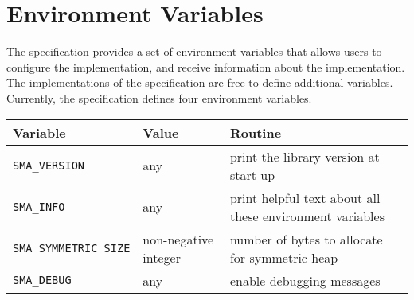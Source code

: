 
\section{Environment Variables }

The \openshmem specification provides a set of environment variables that allows users
to configure the \openshmem implementation, and receive information about the 
implementation. The implementations of the specification are free to define additional variables. Currently, the specification defines four environment variables.

\medskip{}


\begin{tabular}{|l|l|l|}
\hline 
Variable & Value & Routine\tabularnewline
\hline 
\hline 
\texttt{SMA\_VERSION} & any & print the library version at start-up\tabularnewline
\hline 
\texttt{SMA\_INFO} & any & print helpful text about all these environment variables\tabularnewline
\hline 
\texttt{SMA\_SYMMETRIC\_SIZE} & non-negative integer & number of bytes to allocate for symmetric heap\tabularnewline
\hline 
\texttt{SMA\_DEBUG} & any & enable debugging messages\tabularnewline
\hline 
\end{tabular}

\medskip{}
